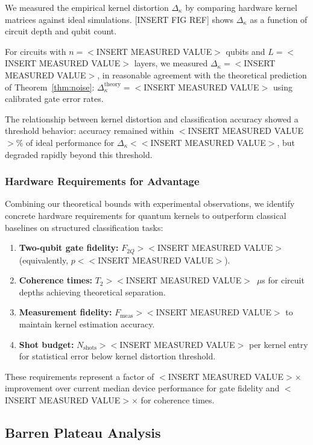 \documentclass[aps,prb,reprint,superscriptaddress,showpacs]{revtex4-2}
\begin{document}
We measured the empirical kernel distortion $\Delta_\kappa$ by comparing hardware kernel matrices against ideal simulations. [INSERT FIG REF] shows $\Delta_\kappa$ as a function of circuit depth and qubit count.

For circuits with $n = <$INSERT MEASURED VALUE$>$ qubits and $L = <$INSERT MEASURED VALUE$>$ layers, we measured $\Delta_\kappa = <$INSERT MEASURED VALUE$>$, in reasonable agreement with the theoretical prediction of Theorem~\ref{thm:noise}: $\Delta_\kappa^{\text{theory}} = <$INSERT MEASURED VALUE$>$ using calibrated gate error rates.

The relationship between kernel distortion and classification accuracy showed a threshold behavior: accuracy remained within $<$INSERT MEASURED VALUE$>$\% of ideal performance for $\Delta_\kappa < <$INSERT MEASURED VALUE$>$, but degraded rapidly beyond this threshold.

\subsubsection{Hardware Requirements for Advantage}

Combining our theoretical bounds with experimental observations, we identify concrete hardware requirements for quantum kernels to outperform classical baselines on structured classification tasks:

\begin{enumerate}[label=(\roman*)]
    \item \textbf{Two-qubit gate fidelity:} $F_{2Q} > <$INSERT MEASURED VALUE$>$ (equivalently, $p < <$INSERT MEASURED VALUE$>$).
    \item \textbf{Coherence times:} $T_2 > <$INSERT MEASURED VALUE$>$~$\mu$s for circuit depths achieving theoretical separation.
    \item \textbf{Measurement fidelity:} $F_{\text{meas}} > <$INSERT MEASURED VALUE$>$ to maintain kernel estimation accuracy.
    \item \textbf{Shot budget:} $N_{\text{shots}} > <$INSERT MEASURED VALUE$>$ per kernel entry for statistical error below kernel distortion threshold.
\end{enumerate}

These requirements represent a factor of $<$INSERT MEASURED VALUE$>\times$ improvement over current median device performance for gate fidelity and $<$INSERT MEASURED VALUE$>\times$ for coherence times.


\subsection{Barren Plateau Analysis}
\end{document}

